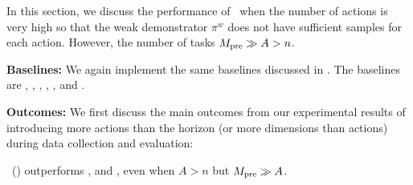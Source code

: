 In this section, we discuss the performance of \pred\ when the number of actions is very high so that the weak demonstrator $\pi^w$ does not have sufficient samples for each action. However, the number of tasks $M_{\text{pre}} \gg A > n$.

\textbf{Baselines:} We again implement the same baselines discussed in . The baselines are \pred, \predt, \dptg, \ad, \ts, and \linucb. 


\textbf{Outcomes:} We first discuss the main outcomes from our experimental results of introducing more actions than the horizon (or more dimensions than actions) during data collection and evaluation:

\begin{tcolorbox}
\customfinding \pred\ (\gt) outperforms \dptg, and \ad, even when $A > n$ but $M_{\text{pre}} \gg A$.
\end{tcolorbox}








